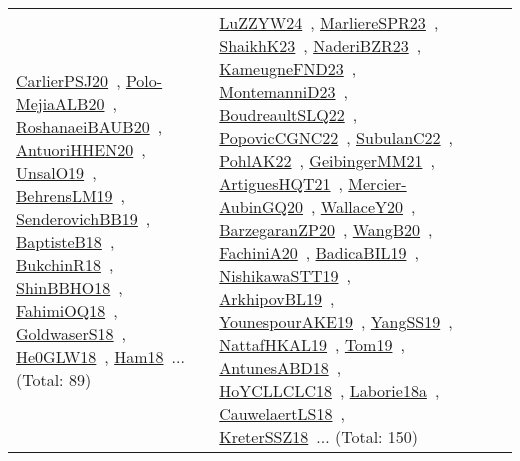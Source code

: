 {\begin{longtable}{lp{3cm}>{\raggedright\arraybackslash}p{6cm}>{\raggedright\arraybackslash}p{6cm}>{\raggedright\arraybackslash}p{8cm}}
\href{../works/CarlierPSJ20.pdf}{CarlierPSJ20}~\cite{CarlierPSJ20}, \href{../works/Polo-MejiaALB20.pdf}{Polo-MejiaALB20}~\cite{Polo-MejiaALB20}, \href{../works/RoshanaeiBAUB20.pdf}{RoshanaeiBAUB20}~\cite{RoshanaeiBAUB20}, \href{../works/AntuoriHHEN20.pdf}{AntuoriHHEN20}~\cite{AntuoriHHEN20}, \href{../works/UnsalO19.pdf}{UnsalO19}~\cite{UnsalO19}, \href{../works/BehrensLM19.pdf}{BehrensLM19}~\cite{BehrensLM19}, \href{../works/SenderovichBB19.pdf}{SenderovichBB19}~\cite{SenderovichBB19}, \href{../works/BaptisteB18.pdf}{BaptisteB18}~\cite{BaptisteB18}, \href{../works/BukchinR18.pdf}{BukchinR18}~\cite{BukchinR18}, \href{../works/ShinBBHO18.pdf}{ShinBBHO18}~\cite{ShinBBHO18}, \href{../works/FahimiOQ18.pdf}{FahimiOQ18}~\cite{FahimiOQ18}, \href{../works/GoldwaserS18.pdf}{GoldwaserS18}~\cite{GoldwaserS18}, \href{../works/He0GLW18.pdf}{He0GLW18}~\cite{He0GLW18}, \href{../works/Ham18.pdf}{Ham18}~\cite{Ham18}... (Total: 89) & \href{../works/LuZZYW24.pdf}{LuZZYW24}~\cite{LuZZYW24}, \href{../works/MarliereSPR23.pdf}{MarliereSPR23}~\cite{MarliereSPR23}, \href{../works/ShaikhK23.pdf}{ShaikhK23}~\cite{ShaikhK23}, \href{../works/NaderiBZR23.pdf}{NaderiBZR23}~\cite{NaderiBZR23}, \href{../works/KameugneFND23.pdf}{KameugneFND23}~\cite{KameugneFND23}, \href{../works/MontemanniD23.pdf}{MontemanniD23}~\cite{MontemanniD23}, \href{../works/BoudreaultSLQ22.pdf}{BoudreaultSLQ22}~\cite{BoudreaultSLQ22}, \href{../works/PopovicCGNC22.pdf}{PopovicCGNC22}~\cite{PopovicCGNC22}, \href{../works/SubulanC22.pdf}{SubulanC22}~\cite{SubulanC22}, \href{../works/PohlAK22.pdf}{PohlAK22}~\cite{PohlAK22}, \href{../works/GeibingerMM21.pdf}{GeibingerMM21}~\cite{GeibingerMM21}, \href{../works/ArtiguesHQT21.pdf}{ArtiguesHQT21}~\cite{ArtiguesHQT21}, \href{../works/Mercier-AubinGQ20.pdf}{Mercier-AubinGQ20}~\cite{Mercier-AubinGQ20}, \href{../works/WallaceY20.pdf}{WallaceY20}~\cite{WallaceY20}, \href{../works/BarzegaranZP20.pdf}{BarzegaranZP20}~\cite{BarzegaranZP20}, \href{../works/WangB20.pdf}{WangB20}~\cite{WangB20}, \href{../works/FachiniA20.pdf}{FachiniA20}~\cite{FachiniA20}, \href{../works/BadicaBIL19.pdf}{BadicaBIL19}~\cite{BadicaBIL19}, \href{../works/NishikawaSTT19.pdf}{NishikawaSTT19}~\cite{NishikawaSTT19}, \href{../works/ArkhipovBL19.pdf}{ArkhipovBL19}~\cite{ArkhipovBL19}, \href{../works/YounespourAKE19.pdf}{YounespourAKE19}~\cite{YounespourAKE19}, \href{../works/YangSS19.pdf}{YangSS19}~\cite{YangSS19}, \href{../works/NattafHKAL19.pdf}{NattafHKAL19}~\cite{NattafHKAL19}, \href{../works/Tom19.pdf}{Tom19}~\cite{Tom19}, \href{../works/AntunesABD18.pdf}{AntunesABD18}~\cite{AntunesABD18}, \href{../works/HoYCLLCLC18.pdf}{HoYCLLCLC18}~\cite{HoYCLLCLC18}, \href{../works/Laborie18a.pdf}{Laborie18a}~\cite{Laborie18a}, \href{../works/CauwelaertLS18.pdf}{CauwelaertLS18}~\cite{CauwelaertLS18}, \href{../works/KreterSSZ18.pdf}{KreterSSZ18}~\cite{KreterSSZ18}... (Total: 150)\\

\end{longtable}}
